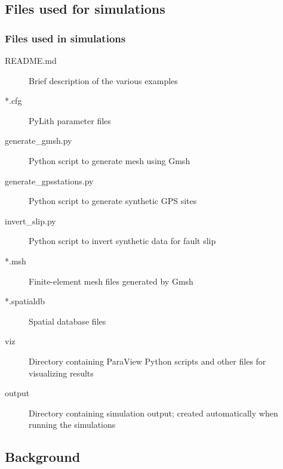 \documentclass{beamer}
\begin{document}
\subsection{Files used for simulations}

\begin{frame}
  \frametitle{Files used in simulations}

  \begin{description}
  \item[README.md] Brief description of the various examples
  \item[*.cfg] PyLith parameter files
  \item[generate\_gmsh.py] Python script to generate mesh using Gmsh
  \item[generate\_gpsstations.py] Python script to generate synthetic
    GPS sites
  \item[invert\_slip.py] Python script to invert synthetic data for
    fault slip
  \item[*.msh] Finite-element mesh files generated by Gmsh
  \item[*.spatialdb] Spatial database files
  \item[viz] Directory containing ParaView Python scripts and other files for visualizing results
  \item[output] Directory containing simulation output; created automatically when running the simulations
  \end{description}

\end{frame}

\subsection{Background}
\end{document}
